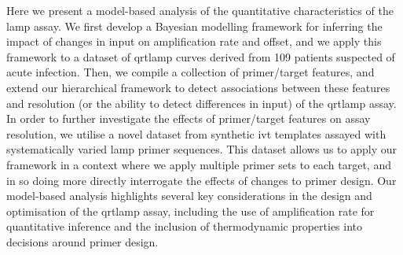 \documentclass[../thesis.tex]{subfiles}
\begin{document}
Here we present a model-based analysis of the quantitative characteristics of the \gls{lamp} assay. We first develop a Bayesian modelling framework for inferring the impact of changes in  input on amplification rate and offset, and we apply this framework to a dataset of \gls{qrtlamp} curves derived from 109 patients suspected of acute infection. Then, we compile a collection of primer/target features, and extend our hierarchical framework to detect associations between these features and resolution (or the ability to detect differences in  input) of the \gls{qrtlamp} assay. In order to further investigate the effects of primer/target features on assay resolution, we utilise a novel dataset from synthetic \gls{ivt}  templates assayed with systematically varied \gls{lamp} primer sequences. This dataset allows us to apply our framework in a context where we apply multiple primer sets to each target, and in so doing more directly interrogate the effects of changes to primer design. Our model-based analysis highlights several key considerations in the design and optimisation of the \gls{qrtlamp} assay, including the use of amplification rate for quantitative inference and the inclusion of thermodynamic properties into decisions around primer design.

 

\enlargethispage{12pt}

\end{document}
